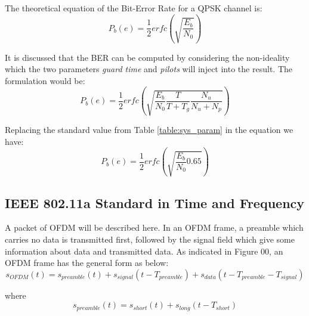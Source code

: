 The theoretical equation of the Bit-Error Rate for a QPSK channel is:\\

\begin{equation} \label{theo_ber}
P_{b}(e)= \dfrac{1}{2}erfc(\sqrt{\dfrac{E_{b}}{N_{0}}})
\end{equation}

It is discussed that the BER can be computed by considering the non-ideality which the two parameters \textit{guard time} and \textit{pilots} will inject into the result. The formulation would be:\\

\begin{equation} \label{theo_ber_guard_pilot}
P_{b}(e)= \dfrac{1}{2}erfc(\sqrt{\dfrac{E_{b}}{N_{0}}\dfrac{T}{T+T_{g}}\dfrac{N_{u}}{N_{u}+N_{p}}})
\end{equation}

Replacing the standard value from Table \ref{table:sys_param} in the equation we have:\\

\begin{equation} \label{theo_ber_ieee}
P_{b}(e)= \dfrac{1}{2}erfc(\sqrt{\dfrac{E_{b}}{N_{0}}0.65})
\end{equation}

\subsection{IEEE 802.11a Standard in Time and Frequency}
A packet of OFDM will be described here. In an OFDM frame, a preamble which carries no data is transmitted first, followed by the signal field which give some information about data and transmitted data. As indicated in Figure 00, an OFDM frame has the general form as below:
\begin{equation} \label{sym_ofdm}
s_{OFDM}(t)= s_{preamble}(t)+ s_{signal}(t- T_{preamble})+ s_{data}(t- T_{preamble}- T_{signal})
\end{equation}

where\\
\begin{equation} \label{preamble_ofdm}
s_{preamble}(t)= s_{short}(t)+ s_{long}(t- T_{short})
\end{equation}

